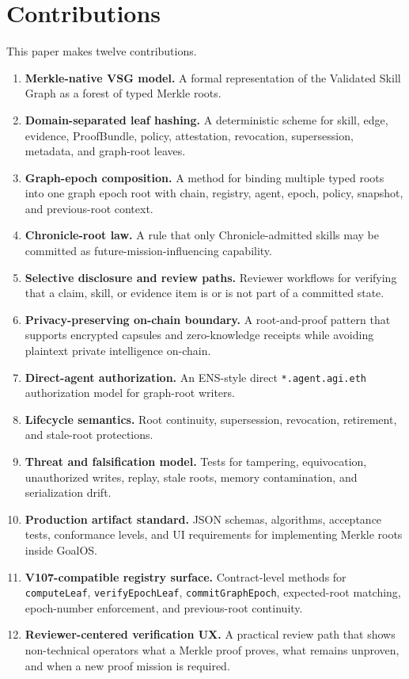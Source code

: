 \documentclass[11pt,letterpaper]{article}
\begin{document}
\section{Contributions}
This paper makes twelve contributions.
\begin{enumerate}
\item \textbf{Merkle-native VSG model.} A formal representation of the Validated Skill Graph as a forest of typed Merkle roots.
\item \textbf{Domain-separated leaf hashing.} A deterministic scheme for skill, edge, evidence, ProofBundle, policy, attestation, revocation, supersession, metadata, and graph-root leaves.
\item \textbf{Graph-epoch composition.} A method for binding multiple typed roots into one graph epoch root with chain, registry, agent, epoch, policy, snapshot, and previous-root context.
\item \textbf{Chronicle-root law.} A rule that only Chronicle-admitted skills may be committed as future-mission-influencing capability.
\item \textbf{Selective disclosure and review paths.} Reviewer workflows for verifying that a claim, skill, or evidence item is or is not part of a committed state.
\item \textbf{Privacy-preserving on-chain boundary.} A root-and-proof pattern that supports encrypted capsules and zero-knowledge receipts while avoiding plaintext private intelligence on-chain.
\item \textbf{Direct-agent authorization.} An ENS-style direct \texttt{*.agent.agi.eth} authorization model for graph-root writers.
\item \textbf{Lifecycle semantics.} Root continuity, supersession, revocation, retirement, and stale-root protections.
\item \textbf{Threat and falsification model.} Tests for tampering, equivocation, unauthorized writes, replay, stale roots, memory contamination, and serialization drift.
\item \textbf{Production artifact standard.} JSON schemas, algorithms, acceptance tests, conformance levels, and UI requirements for implementing Merkle roots inside GoalOS.
\item \textbf{V107-compatible registry surface.} Contract-level methods for \texttt{computeLeaf}, \texttt{verifyEpochLeaf}, \texttt{commitGraphEpoch}, expected-root matching, epoch-number enforcement, and previous-root continuity.
\item \textbf{Reviewer-centered verification UX.} A practical review path that shows non-technical operators what a Merkle proof proves, what remains unproven, and when a new proof mission is required.
\end{enumerate}
\end{document}
